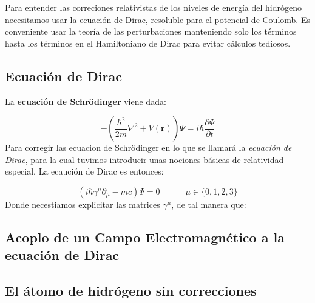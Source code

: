 \documentclass[12pt,a4paper]{article}
\numberwithin{equation}{section}
\numberwithin{figure}{section}
\newcommand{\parentesis}[1]{\left( #1  \right)}
\newcommand{\parciales}[2]{\frac{\partial #1}{\partial #2}}
\newcommand{\tquad}{\quad \quad \quad}
\newcommand{\rn}{\mathbf{r}}
\begin{document}
Para entender las correciones relativistas de los niveles de energía del hidrógeno necesitamos usar la ecuación de Dirac, resoluble para el potencial de Coulomb. Es conveniente usar la teoría de las perturbaciones manteniendo solo los términos hasta los términos en el Hamiltoniano de Dirac para evitar cálculos tediosos. \\

\subsection{Ecuación de Dirac}

La \textbf{ecuación de Schrödinger} viene dada:

\begin{equation}
    - \parentesis{\frac{\hbar^2}{2m} \nabla^2 + V(\rn) }\Psi = i \hbar \parciales{\Psi}{t} 
\end{equation}
Para corregir las ecuacion de Schrödinger en lo que se llamará la \textit{ecuación de Dirac}, para la cual tuvimos introducir unas nociones básicas de relatividad especial. La ecaución de Dirac es entonces:

\begin{equation}
    (i \hbar \gamma^{\mu} \partial_\mu - m c) \Psi = 0 \tquad \mu \in \{ 0,1,2,3 \}
\end{equation}
Donde necestiamos explicitar las matrices $\gamma^{\mu}$, de tal manera que:


\subsection{Acoplo de un Campo Electromagnético a la ecuación de Dirac}

\subsection{El átomo de hidrógeno sin correcciones}
\end{document}
